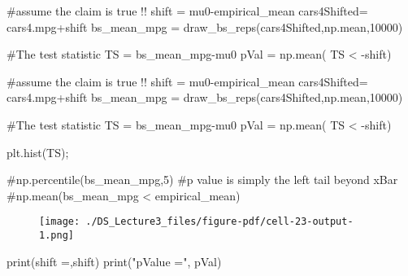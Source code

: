 \documentclass[
  letterpaper,
  DIV=11,
  numbers=noendperiod]{scrreprt}
\newenvironment{Shaded}{\begin{snugshade}}{\end{snugshade}}
\newcommand{\BuiltInTok}[1]{\textcolor[rgb]{0.00,0.23,0.31}{#1}}
\newcommand{\CommentTok}[1]{\textcolor[rgb]{0.37,0.37,0.37}{#1}}
\newcommand{\DecValTok}[1]{\textcolor[rgb]{0.68,0.00,0.00}{#1}}
\newcommand{\NormalTok}[1]{\textcolor[rgb]{0.00,0.23,0.31}{#1}}
\newcommand{\OperatorTok}[1]{\textcolor[rgb]{0.37,0.37,0.37}{#1}}
\newcommand{\StringTok}[1]{\textcolor[rgb]{0.13,0.47,0.30}{#1}}
\begin{document}
\begin{Shaded}
\begin{Highlighting}[]
\CommentTok{\#assume the claim is true !!}
\NormalTok{shift }\OperatorTok{=}\NormalTok{ mu0}\OperatorTok{{-}}\NormalTok{empirical\_mean}
\NormalTok{cars4Shifted}\OperatorTok{=}\NormalTok{ cars4.mpg}\OperatorTok{+}\NormalTok{shift}
\NormalTok{bs\_mean\_mpg }\OperatorTok{=}\NormalTok{ draw\_bs\_reps(cars4Shifted,np.mean,}\DecValTok{10000}\NormalTok{)}

\CommentTok{\#The test statistic}
\NormalTok{TS }\OperatorTok{=}\NormalTok{ bs\_mean\_mpg}\OperatorTok{{-}}\NormalTok{mu0}
\NormalTok{pVal }\OperatorTok{=}\NormalTok{ np.mean( TS }\OperatorTok{\textless{}} \OperatorTok{{-}}\NormalTok{shift)}
\end{Highlighting}
\end{Shaded}

\begin{Shaded}
\begin{Highlighting}[]
\CommentTok{\#assume the claim is true !!}
\NormalTok{shift }\OperatorTok{=}\NormalTok{ mu0}\OperatorTok{{-}}\NormalTok{empirical\_mean}
\NormalTok{cars4Shifted}\OperatorTok{=}\NormalTok{ cars4.mpg}\OperatorTok{+}\NormalTok{shift}
\NormalTok{bs\_mean\_mpg }\OperatorTok{=}\NormalTok{ draw\_bs\_reps(cars4Shifted,np.mean,}\DecValTok{10000}\NormalTok{)}

\CommentTok{\#The test statistic}
\NormalTok{TS }\OperatorTok{=}\NormalTok{ bs\_mean\_mpg}\OperatorTok{{-}}\NormalTok{mu0}
\NormalTok{pVal }\OperatorTok{=}\NormalTok{ np.mean( TS }\OperatorTok{\textless{}} \OperatorTok{{-}}\NormalTok{shift)}

\NormalTok{plt.hist(TS)}\OperatorTok{;}

\CommentTok{\#np.percentile(bs\_mean\_mpg,5)}
\CommentTok{\#p value is simply the left tail beyond xBar}
\CommentTok{\#np.mean(bs\_mean\_mpg \textless{} empirical\_mean)}
\end{Highlighting}
\end{Shaded}

\begin{figure}[H]

{\centering \texttt{[image: ./DS\_Lecture3\_files/figure-pdf/cell-23-output-1.png]}

}

\end{figure}

\begin{Shaded}
\begin{Highlighting}[]
\BuiltInTok{print}\NormalTok{(}\StringTok{\textquotesingle{}shift =\textquotesingle{}}\NormalTok{,shift)}
\BuiltInTok{print}\NormalTok{(}\StringTok{"pValue ="}\NormalTok{, pVal)}
\end{Highlighting}
\end{Shaded}
\end{document}
